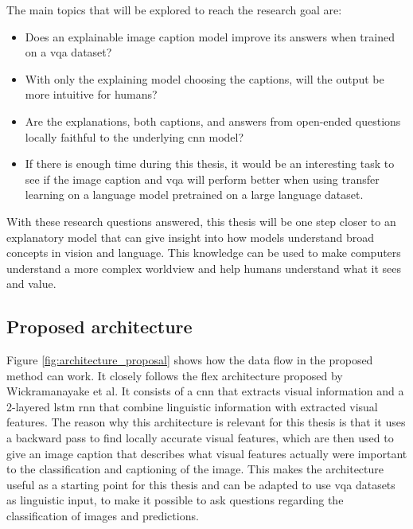 The main topics that will be explored to reach the research goal are: 
\begin{itemize}
    \item Does an explainable image caption model improve its answers when trained on a \gls{vqa} dataset?
    \item With only the explaining model choosing the captions, will the output be more intuitive for humans?
    \item Are the explanations, both captions, and answers from open-ended questions locally faithful to the underlying \gls{cnn} model?
    \item If there is enough time during this thesis, it would be an interesting task to see if the image caption and \gls{vqa} will perform better when using transfer learning  on a language model pretrained on a large language dataset. 
\end{itemize}

With these research questions answered, this thesis will be one step closer to an explanatory model that can give insight into how models understand broad concepts in vision and language. This knowledge can be used to make computers understand a more complex worldview and help humans understand what it sees and value.

\subsection{Proposed architecture}
Figure \ref{fig:architecture_proposal} shows how the data flow in the proposed method can work. It closely follows the \gls{flex}\cite{wickramanayakeFLEXFaithfulLinguistic2019} architecture proposed by Wickramanayake et al. It consists of a \gls{cnn} that extracts visual information and a 2-layered \gls{lstm}\cite{hochreiterLongShorttermMemory1997} \gls{rnn} that combine linguistic information with extracted visual features. The reason why this architecture is relevant for this thesis is that it uses a backward pass to find locally accurate visual features, which are then used to give an image caption that describes what visual features actually were important to the classification and captioning of the image. This makes the architecture useful as a starting point for this thesis and can be adapted to use \gls{vqa} datasets as linguistic input, to make it possible to ask questions regarding the classification of images and predictions. 


